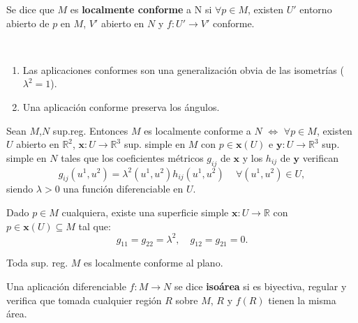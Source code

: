 \documentclass[twoside]{report}
\begin{document}
\begin{defi}
Se dice que $M$ es \textbf{localmente conforme} a N si $\forall p \in M$, existen $U'$ entorno abierto de $p$ en $M$, $V'$ abierto en $N$ y $f: U' \rightarrow V'$ conforme.
\end{defi}

\begin{nota}

\

\begin{enumerate}
\item Las aplicaciones conformes son una generalizaci\'on obvia de las isometr\'ias ($\lambda^2=1$).
\item Una aplicaci\'on conforme preserva los \'angulos.
\end{enumerate}
\end{nota}

\begin{teorema}
Sean $M$,$N$ sup.reg. Entonces $M$ es localmente conforme a $N$ $\Leftrightarrow$ $\forall p \in M$, existen $U$ abierto en $\mathbb{R}^2$, $\textbf{x}: U\rightarrow \mathbb{R}^3$ sup. simple en $M$ con $p\in \textbf{x}(U)$ e $\textbf{y}: U\rightarrow \mathbb{R}^3$ sup. simple en $N$ tales que los coeficientes m\'etricos $g_{ij}$ de $\textbf{x}$ y los $h_{ij}$ de $\textbf{y}$ verifican
$$ g_{ij}(u^1,u^2) = \lambda^2(u^1,u^2)h_{ij}(u^1,u^2) \, \, \, \, \, \, \, \forall (u^1,u^2)\in U,$$
siendo $\lambda > 0$ una funci\'on diferenciable en $U$.

\end{teorema}

\begin{teorema}
Dado $p \in M$ cualquiera, existe una superficie simple $\textbf{x}: U\longrightarrow \mathbb{R}$ con $ p\in \textbf{x}(U) \subseteq M $ tal que:
$$g_{11}= g_{22}= \lambda^2, \quad g_{12}=g_{21}=0.$$
\end{teorema}

\begin{coro}
Toda sup. reg. $M$ es localmente conforme al plano.
\end{coro}

\begin{defi}
Una aplicaci\'on diferenciable $ f: M\longrightarrow N$ se dice \textbf{iso\'area} si es biyectiva, regular y verifica que tomada cualquier regi\'on $R$ sobre $M$, $R$ y $f(R)$ tienen la misma \'area.
\end{defi}
\end{document}
